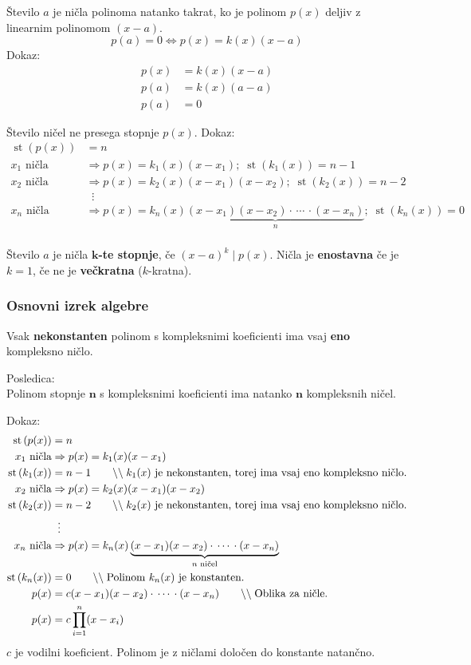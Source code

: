 \documentclass[a4paper,oneside,12pt,fleqn]{article}
\newcommand\krat\cdot
\newcommand{\comment}[1]{\ensuremath{\qquad\backslash\backslash\;}\textnormal{#1}}
\newcommand{\st}{\ensuremath{\operatorname{st}}} %
\renewcommand\implies\Rightarrow
\renewcommand\iff\Leftrightarrow
\numberwithin{equation}{section}
\begin{document}
Število $a$ je ničla polinoma natanko takrat, ko je polinom $p(x)$ deljiv z linearnim
polinomom $(x-a)$.
\[ p(a) = 0 \iff p(x) = k(x)(x-a) \]
Dokaz:
\begin{align*}
  p(x) &= k(x)(x-a) \\
  p(a) &= k(x)(a-a) \\
  p(a) &= 0
\end{align*}

Število ničel ne presega stopnje $p(x)$. Dokaz:
\begin{align*}
  \st\left( p(x) \right) &= n \\
  x_1 \text{ ničla} &\implies p(x) = k_1(x)(x-x_1); \; \st\left( k_1(x) \right) = n-1 \\
  x_2 \text{ ničla} &\implies p(x) = k_2(x)(x-x_1)(x-x_2); \; \st\left( k_2(x) \right) = n-2 \\
  & \;\; \vdots \\
  x_n \text{ ničla} &\implies p(x) =
  k_n(x)\underbrace{(x-x_1)(x-x_2)\krat\,\cdots\,\krat(x-x_n)}_{n}; \; \st\left( k_n(x) \right) = 0 \\
\end{align*}

Število $a$ je ničla \textbf{$\boldsymbol k$-te stopnje}, če $(x-a)^k\;|\;p(x)$. Ničla je
\textbf{enostavna} če je $k = 1$, če ne je \textbf{večkratna} ($k$-kratna).

\subsubsection{Osnovni izrek algebre}
\label{sec:pol:nic:osnalg}
Vsak \textbf{nekonstanten} polinom s kompleksnimi koeficienti ima vsaj \textbf{eno} kompleksno ničlo.

Posledica:\\
Polinom stopnje $\boldsymbol n$ s kompleksnimi koeficienti ima natanko $\boldsymbol n$ kompleksnih ničel.

Dokaz:
\begin{align*}
  \st\left( p(x) \right) &= n \\
  x_1 \text{ ničla} &\implies p(x) = k_1(x)(x-x_1) \\
  \st\left( k_1(x) \right) &= n-1 \comment{$k_1(x)$ je nekonstanten, torej ima
  vsaj eno kompleksno ničlo.} \\
  x_2 \text{ ničla} &\implies p(x) = k_2(x)(x-x_1)(x-x_2) \\
  \st\left( k_2(x) \right) &= n-2 \comment{$k_2(x)$ je nekonstanten, torej ima
  vsaj eno kompleksno ničlo.} \\
  & \;\; \vdots \\
  x_n \text{ ničla} &\implies p(x) =
  k_n(x)\underbrace{(x-x_1)(x-x_2)\krat\,\cdots\,\krat(x-x_n)}_{n \text{ ničel}} \\
  \st\left( k_n(x) \right) &= 0 \comment{Polinom $k_n(x)$ je konstanten.} \\
  p(x) &= c(x-x_1)(x-x_2)\krat\,\cdots\,\krat(x-x_n) \comment{Oblika za ničle.} \\
  p(x) &= c\prod_{i=1}^{n}(x-x_i)
\end{align*}
$c$ je vodilni koeficient. Polinom je z ničlami določen do konstante natančno.
\end{document}
